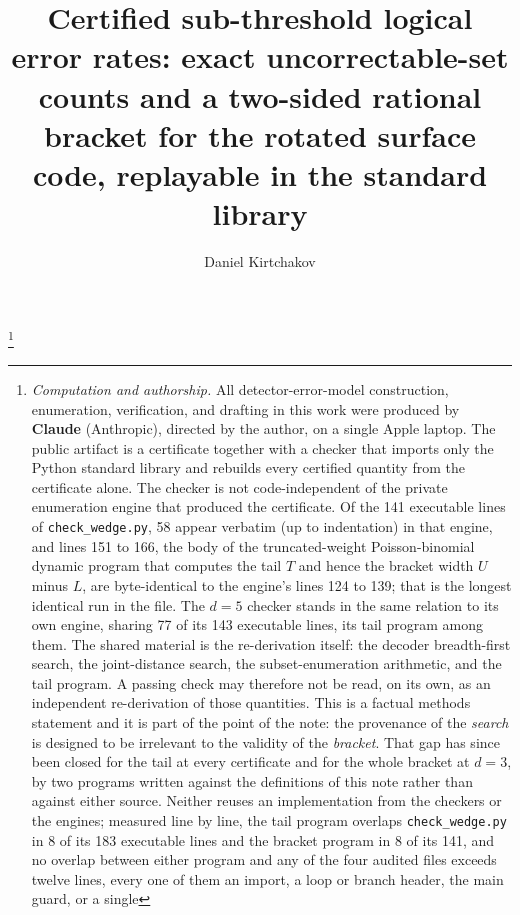 \documentclass[11pt]{amsart}
\theoremstyle{plain}
\theoremstyle{definition}
\theoremstyle{remark}
\begin{document}
\title[Certified sub-threshold logical error brackets]{Certified
sub-threshold logical error rates: exact uncorrectable-set counts and a
two-sided rational bracket for the rotated surface code, replayable in the
standard library}

\author{Daniel Kirtchakov}
\address{Independent researcher (\texttt{05oz}), Half Ounce Research; no
institutional affiliation. ORCID:
\href{https://orcid.org/0009-0009-5213-4098}{0009-0009-5213-4098}.}

\thanks{\emph{Computation and authorship.} All detector-error-model
construction, enumeration, verification, and drafting in this work were
produced by \textbf{Claude} (Anthropic), directed by the author, on a single
Apple laptop. The public artifact is a certificate together with a checker that imports
only the Python standard library and rebuilds every certified quantity from
the certificate alone. The checker is not code-independent of the private
enumeration engine that produced the certificate. Of the 141 executable
lines of \texttt{check\_wedge.py}, 58 appear verbatim (up to indentation) in
that engine, and lines 151 to 166, the body of the truncated-weight
Poisson-binomial dynamic program that computes the tail $T$ and hence the
bracket width $U$ minus $L$, are byte-identical to the engine's lines 124 to
139; that is the longest identical run in the file. The $d=5$ checker stands
in the same relation to its own engine, sharing 77 of its 143 executable
lines, its tail program among them. The shared material is the re-derivation
itself: the decoder breadth-first search, the joint-distance search, the
subset-enumeration arithmetic, and the tail program. A passing check may
therefore not be read, on its own, as an independent re-derivation of those
quantities. This is a factual methods
statement and it is part of the point of the note: the provenance of the
\emph{search} is designed to be irrelevant to the validity of the
\emph{bracket}.\endgraf
That gap has since been closed for the tail at every certificate and for the
whole bracket at $d=3$, by two programs written against the definitions of
this note rather than against either source. Neither reuses an
implementation from the checkers or the engines; measured line by line, the
tail program overlaps \texttt{check\_wedge.py} in 8 of its 183 executable
lines and the bracket program in 8 of its 141, and no overlap between either
program and any of the four audited files exceeds twelve lines, every one of
them an import, a loop or branch header, the main guard, or a single
}
\end{document}
